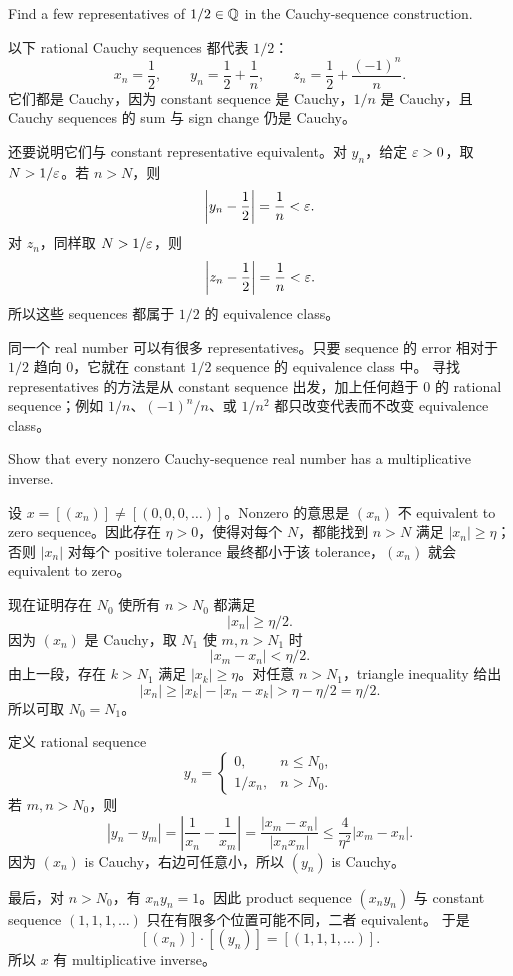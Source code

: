 \begin{exerciseblock}
Find a few representatives of \(1/2\in\mathbb{Q}\) in the Cauchy-sequence construction.
\end{exerciseblock}

\begin{solution}
以下 rational Cauchy sequences 都代表 \(1/2\)：
\[
  x_n=\frac12,\qquad
  y_n=\frac12+\frac1n,\qquad
  z_n=\frac12+\frac{(-1)^n}{n}.
\]
它们都是 Cauchy，因为 constant sequence 是 Cauchy，\(1/n\) 是 Cauchy，且 Cauchy
sequences 的 sum 与 sign change 仍是 Cauchy。

还要说明它们与 constant representative equivalent。对 \(y_n\)，给定
\(\varepsilon>0\)，取 \(N>1/\varepsilon\)。若 \(n>N\)，则
\[
  \left|y_n-\frac12\right|=\frac1n<\varepsilon.
\]
对 \(z_n\)，同样取 \(N>1/\varepsilon\)，则
\[
  \left|z_n-\frac12\right|=\frac1n<\varepsilon.
\]
所以这些 sequences 都属于 \(1/2\) 的 equivalence class。
\end{solution}

\begin{explanation}
同一个 real number 可以有很多 representatives。只要 sequence 的 error 相对于
\(1/2\) 趋向 \(0\)，它就在 constant \(1/2\) sequence 的 equivalence class 中。
寻找 representatives 的方法是从 constant sequence 出发，加上任何趋于 \(0\) 的
rational sequence；例如 \(1/n\)、\((-1)^n/n\)、或 \(1/n^2\) 都只改变代表而不改变
equivalence class。
\end{explanation}

\begin{exerciseblock}
Show that every nonzero Cauchy-sequence real number has a multiplicative inverse.
\end{exerciseblock}

\begin{solution}
设 \(x=[(x_n)]\ne[(0,0,0,\ldots)]\)。Nonzero 的意思是 \((x_n)\) 不 equivalent to
zero sequence。因此存在 \(\eta>0\)，使得对每个 \(N\)，都能找到 \(n>N\) 满足
\(|x_n|\geq\eta\)；否则 \(|x_n|\) 对每个 positive tolerance 最终都小于该
tolerance，\((x_n)\) 就会 equivalent to zero。

现在证明存在 \(N_0\) 使所有 \(n>N_0\) 都满足
\[
  |x_n|\geq\eta/2.
\]
因为 \((x_n)\) 是 Cauchy，取 \(N_1\) 使 \(m,n>N_1\) 时
\[
  |x_m-x_n|<\eta/2.
\]
由上一段，存在 \(k>N_1\) 满足 \(|x_k|\geq\eta\)。对任意 \(n>N_1\)，triangle
inequality 给出
\[
  |x_n|\geq |x_k|-|x_n-x_k|>\eta-\eta/2=\eta/2.
\]
所以可取 \(N_0=N_1\)。

定义 rational sequence
\[
  y_n=
  \begin{cases}
    0,& n\leq N_0,\\
    1/x_n,& n>N_0.
  \end{cases}
\]
若 \(m,n>N_0\)，则
\[
  |y_n-y_m|
  =\left|\frac1{x_n}-\frac1{x_m}\right|
  =\frac{|x_m-x_n|}{|x_nx_m|}
  \leq \frac{4}{\eta^2}|x_m-x_n|.
\]
因为 \((x_n)\) is Cauchy，右边可任意小，所以 \((y_n)\) is Cauchy。

最后，对 \(n>N_0\)，有 \(x_ny_n=1\)。因此 product sequence \((x_ny_n)\) 与
constant sequence \((1,1,1,\ldots)\) 只在有限多个位置可能不同，二者 equivalent。
于是
\[
  [(x_n)]\cdot[(y_n)]=[(1,1,1,\ldots)].
\]
所以 \(x\) 有 multiplicative inverse。
\end{solution}

